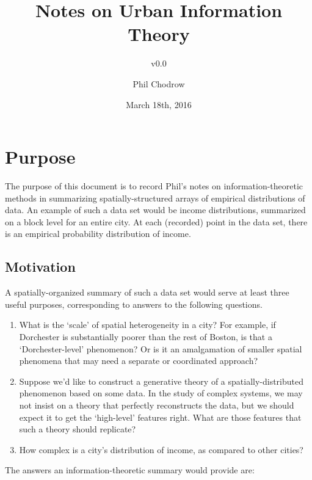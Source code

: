 \documentclass[english]{scrartcl}
\title{Notes on Urban Information Theory}
\subtitle{v0.0}
\author{Phil Chodrow}
\date{March 18th, 2016}
\begin{document}
\maketitle

\section{Purpose}
	The purpose of this document is to record Phil's notes on information-theoretic methods in summarizing spatially-structured arrays of empirical distributions of data. An example of such a data set would be income distributions, summarized on a block level for an entire city. At each (recorded) point in the data set, there is an empirical probability distribution of income.

	\subsection{Motivation}
		A spatially-organized summary of such a data set would serve at least three useful purposes, corresponding to answers to the following questions.
		\begin{enumerate}
			\item What is the `scale' of spatial heterogeneity in a city? For example, if Dorchester is substantially poorer than the rest of Boston, is that a `Dorchester-level' phenomenon? Or is it an amalgamation of smaller spatial phenomena that may need a separate or coordinated approach?
			\item Suppose we'd like to construct a generative theory of a spatially-distributed phenomenon based on some data. In the study of complex systems, we may not insist on a theory that perfectly reconstructs the data, but we should expect it to get the `high-level' features right. What are those features that such a theory should replicate?
			\item How complex is a city's distribution of income, as compared to other cities?
		\end{enumerate}
		The answers an information-theoretic summary would provide are:
\end{document}
